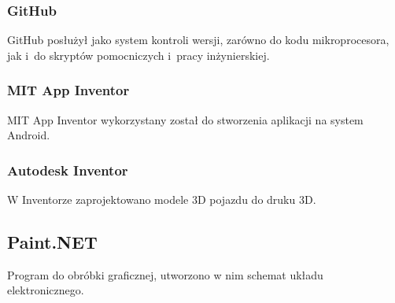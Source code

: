 \subsubsection*{GitHub}
GitHub posłużył jako system kontroli wersji, zarówno do kodu mikroprocesora, jak i~do skryptów pomocniczych i~pracy inżynierskiej.

\subsubsection*{MIT App Inventor}
MIT App Inventor wykorzystany został do stworzenia aplikacji na system Android.

\subsubsection*{Autodesk Inventor}
W Inventorze zaprojektowano modele 3D pojazdu do druku 3D.

\subsection*{Paint.NET}
Program do obróbki graficznej, utworzono w nim schemat układu elektronicznego.